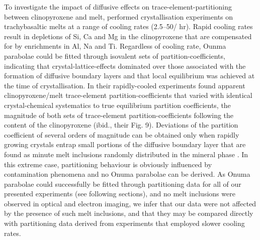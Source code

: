 
To investigate the impact of diffusive effects on trace-element-partitioning between clinopyroxene and melt, \citet{Mollo2013} performed crystallisation experiments on trachybasaltic melts at a range of cooling rates (2.5--50\dgC/ hr). Rapid cooling rates result in depletions of Si, Ca and Mg in the clinopyroxene that are compensated for by enrichments in Al, Na and Ti. Regardless of cooling rate, Ounma parabolae could be fitted through isovalent sets of partition-coefficients, indicating that crystal-lattice-effects dominated over those associated with the formation of diffusive boundary layers and that local equilibrium was achieved at the time of crystallisation.
    In their rapidly-cooled experiments \citet{Mollo2013} found apparent clinopyroxene/melt trace-element partition-coefficients that varied with identical crystal-chemical systematics to true equilibrium partition coefficients, the magnitude of both sets of trace-element partition-coefficients following the  content of the clinopyroxene (ibid., their Fig. 9). 
Deviations of the partition coefficient of several orders of magnitude can be obtained only when rapidly growing crystals entrap small portions of the diffusive boundary layer that are found as minute melt inclusions randomly distributed in the mineral phase \citep{Kennedy1993}. In this extreme case, partitioning behaviour is obviously influenced by contamination phenomena and no Onuma parabolae can be derived. As Onuma parabolae could successfully be fitted through partitioning data for all of our presented experiments (see following sections), and no melt inclusions were observed in optical and electron imaging, we infer that our data were not affected by the presence of such melt inclusions, and that they may be compared directly with partitioning data derived from experiments that employed slower cooling rates.

